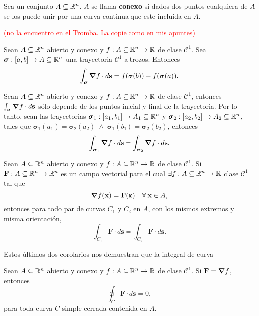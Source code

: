 \begin{definition}
    Sea un conjunto $A\subseteq\mathbb{R}^n$. $A$ se llama \textbf{conexo} si dados dos puntos cualquiera de $A$ se los puede unir por una curva continua que este incluida en $A$.

    \textcolor{red}{(no la encuentro en el Tromba. La copie como en mis apuntes)}
\end{definition}

\begin{theorem} \label{thm:t1}
    Sean $A\subseteq\mathbb{R}^n$ abierto y conexo y $f:A\subseteq\mathbb{R}^n\to\mathbb{R}$ de clase $\mathcal{C}^1$. Sea $\boldsymbol{\sigma}:[a,b]\to A\subseteq\mathbb{R}^n$ una trayectoria $\mathcal{C}^1$ a trozos. Entonces
    \[
       \int_{\boldsymbol{\sigma}}\grad f\cdot d\mathbf{s}=f(\boldsymbol{\sigma}(b))-f(\boldsymbol{\sigma}(a)).
    \]    
\end{theorem}

\begin{corollary}
    Sean $A\subseteq\mathbb{R}^n$ abierto y conexo y $f:A\subseteq\mathbb{R}^n\to\mathbb{R}$ de clase $\mathcal{C}^1$, entonces $\int_{\boldsymbol{\sigma}}\grad f\cdot d\mathbf{s}$  s\'olo depende de los puntos inicial y final de la trayectoria. Por lo tanto, sean las trayectorias $\boldsymbol{\sigma}_1:[a_1,b_1]\to A_1\subseteq\mathbb{R}^n$ y $\boldsymbol{\sigma}_2:[a_2,b_2]\to A_2\subseteq\mathbb{R}^n$, tales que $\boldsymbol{\sigma}_1(a_1)=\boldsymbol{\sigma}_2(a_2)\;\land\;\boldsymbol{\sigma}_1(b_1)=\boldsymbol{\sigma}_2(b_2)$, entonces
    \[
    \int_{\boldsymbol{\sigma}_1}\grad f\cdot d\mathbf{s}=\int_{\boldsymbol{\sigma}_2}\grad f\cdot d\mathbf{s}.
    \]
\end{corollary}

\begin{corollary}
    Sean $A\subseteq\mathbb{R}^n$ abierto y conexo y $f:A\subseteq\mathbb{R}^n\to\mathbb{R}$ de clase $\mathcal{C}^1$. Si $\mathbf{F}:A\subseteq\mathbb{R}^n\to\mathbb{R}^n$ es un campo vectorial para el cual $\exists f:A\subseteq\mathbb{R}^n\to\mathbb{R}$ clase $\mathcal{C}^1$ tal que 
    $$\grad f(\mathbf{x})=\mathbf{F}(\mathbf{x})\quad\forall\:\mathbf{x}\in A,$$
    entonces para todo par de curvas $C_1$ y $C_2$ en $A$, con los mismos extremos y misma orientaci\'on,
    \[
    \int_{C_1}\mathbf{F}\cdot d\mathbf{s}=\int_{C_2}\mathbf{F}\cdot d\mathbf{s}. 
    \]
\end{corollary}

Estos \'ultimos dos corolarios nos demuestran que la integral de curva 

\begin{corollary}
    Sean $A\subseteq\mathbb{R}^n$ abierto y conexo y $f:A\subseteq\mathbb{R}^n\to\mathbb{R}$ de clase $\mathcal{C}^1$. Si $\mathbf{F}=\grad f$, entonces
    $$\oint_C\mathbf{F}\cdot d\mathbf{s}=0,$$
    para toda curva $C$ simple cerrada contenida en $A$.
\end{corollary}

